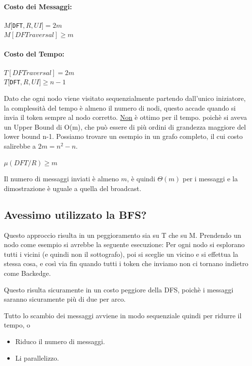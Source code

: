 \paragraph{Costo dei Messaggi:}

\begin{center}
    $M[$\texttt{DFT}$,R,UI] = 2m ~~$\\
    $M[DFTraversal] \geq m$
\end{center}

\paragraph{Costo del Tempo:}

\begin{center}
    $T[DFTraversal] = 2m$\\
    $T[$\texttt{DFT}$,R,UI] \geq n-1 $
\end{center}

Dato che ogni nodo viene visitato sequenzialmente partendo dall'unico
iniziatore, la complessità del tempo è almeno il numero di nodi, questo accade
quando si invia il token sempre al nodo corretto. \underline{Non} è ottimo per
il tempo. poichè si aveva un Upper Bound di O(m), che può essere di più ordini
di grandezza maggiore del lower bound n-1. Possiamo trovare un esempio in un
grafo completo, il cui costo salirebbe a $2m=n^2-n$.

\begin{center}
    $\mu(DFT/R) \geq m$
\end{center}
Il numero di messaggi inviati è almeno $m$, è quindi $\Theta(m)$ per i messaggi
e la dimostrazione è uguale a quella del broadcast.

\subsection{Avessimo utilizzato la BFS?}
Questo approccio risulta in un peggioramento sia su T che su M. Prendendo un
nodo come esempio si avrebbe la seguente esecuzione: Per ogni nodo si esplorano
tutti i vicini (e quindi non il sottografo), poi si sceglie un vicino e si
effettua la stessa cosa, e così via fin quando tutti i token che inviamo non ci
tornano indietro come Backedge.

Questo risulta sicuramente in un costo peggiore della DFS, poichè i messaggi
saranno sicuramente più di due per arco.

Tutto lo scambio dei messaggi avviene in modo sequenziale quindi per ridurre il
tempo, o
\begin{itemize}
    \item Riduco il numero di messaggi.
    \item Li parallelizzo.
\end{itemize}

